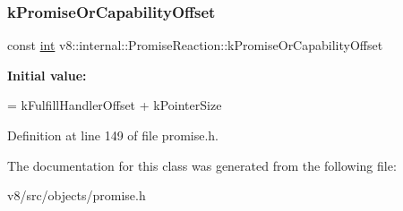 \subsubsection{\texorpdfstring{k\+Promise\+Or\+Capability\+Offset}{kPromiseOrCapabilityOffset}}
{\footnotesize\ttfamily const \mbox{\hyperlink{classint}{int}} v8\+::internal\+::\+Promise\+Reaction\+::k\+Promise\+Or\+Capability\+Offset\hspace{0.3cm}{\ttfamily [static]}}

{\bfseries Initial value\+:}
\begin{DoxyCode}
=
      kFulfillHandlerOffset + kPointerSize
\end{DoxyCode}


Definition at line 149 of file promise.\+h.



The documentation for this class was generated from the following file\+:\begin{DoxyCompactItemize}
\item 
v8/src/objects/promise.\+h\end{DoxyCompactItemize}
